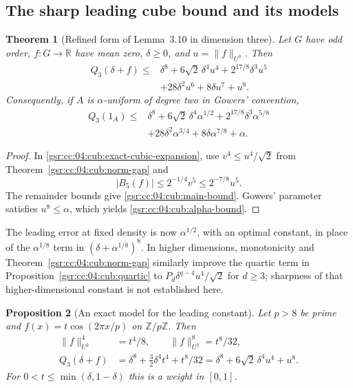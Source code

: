\documentclass[11pt,letterpaper]{article}
\numberwithin{equation}{section}
\newtheorem{theorem}{Theorem}[section]
\newtheorem{proposition}[theorem]{Proposition}
\theoremstyle{definition}
\theoremstyle{remark}
\newcommand{\1}{\mathbf 1}
\begin{document}
\subsection{The sharp leading cube bound and its models}

\begin{theorem}[Refined form of Lemma~3.10 in dimension three]
\label{gsr:cc:04:cub:main}
Let $G$ have odd order, $f:G\to\mathbb R$ have mean zero, $\delta\geq0$,
and $u=\|f\|_{U^3}$. Then
\begin{align}
 Q_3(\delta+f)\leq{}&\delta^8+6\sqrt2\,\delta^4u^4
                 +2^{17/8}\delta^3u^5\nonumber\\
                 &+28\delta^2u^6+8\delta u^7+u^8.
 \label{gsr:cc:04:cub:main-bound}
\end{align}
Consequently, if $A$ is $\alpha$-uniform of degree two in Gowers' convention,
\begin{align}
 Q_3(1_A)\leq{}&\delta^8+6\sqrt2\,\delta^4\alpha^{1/2}
                 +2^{17/8}\delta^3\alpha^{5/8}\nonumber\\
                 &+28\delta^2\alpha^{3/4}
                   +8\delta\alpha^{7/8}+\alpha.
 \label{gsr:cc:04:cub:alpha-bound}
\end{align}
\end{theorem}

\begin{proof}
In \eqref{gsr:cc:04:cub:exact-cubic-expansion}, use
$v^4\leq u^4/\sqrt2$ from Theorem~\ref{gsr:cc:04:cub:norm-gap} and
\[
 |B_5(f)|\leq2^{-1/4}v^5\leq2^{-7/8}u^5.
\]
The remainder bounds give \eqref{gsr:cc:04:cub:main-bound}. Gowers' parameter
satisfies $u^8\leq\alpha$, which yields \eqref{gsr:cc:04:cub:alpha-bound}.
\end{proof}

The leading error at fixed density is now $\alpha^{1/2}$, with an optimal
constant, in place of the $\alpha^{1/8}$ term in
$(\delta+\alpha^{1/8})^8$. In higher dimensions, monotonicity and
Theorem~\ref{gsr:cc:04:cub:norm-gap} similarly improve the quartic term in
Proposition~\ref{gsr:cc:04:cub:quartic} to
$P_d\delta^{q-4}u^4/\sqrt2$ for $d\geq3$; sharpness of that higher-dimensional
constant is not established here.

\begin{proposition}[An exact model for the leading constant]
\label{gsr:cc:04:cub:cosine}
Let $p>8$ be prime and $f(x)=t\cos(2\pi x/p)$ on $\mathbb Z/p\mathbb Z$.
Then
\begin{align}
 \|f\|_{U^2}^4&=t^4/8,\qquad \|f\|_{U^3}^8=t^8/32,\\
 Q_3(\delta+f)&=\delta^8+\tfrac32\delta^4t^4+t^8/32
               =\delta^8+6\sqrt2\,\delta^4u^4+u^8.
 \label{gsr:cc:04:cub:cosine-exact}
\end{align}
For $0<t\leq\min(\delta,1-\delta)$ this is a weight in $[0,1]$.
\end{proposition}
\end{document}
